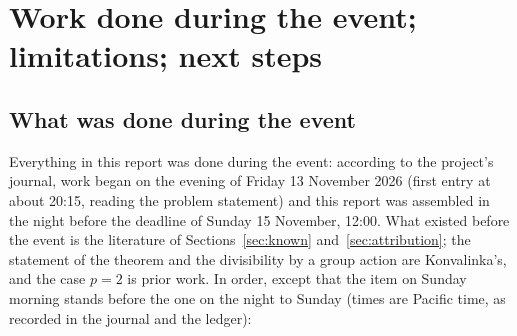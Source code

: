 \documentclass[11pt]{article}
\theoremstyle{definition}
\theoremstyle{remark}
\numberwithin{equation}{section}
\numberwithin{figure}{section}
\begin{document}
\section{Work done during the event; limitations; next steps}\label{sec:event}
\subsection{What was done during the event}
Everything in this report was done during the event: according to the project's journal, work began on the
evening of Friday 13 November 2026 (first entry at about 20:15, reading the problem statement) and this
report was assembled in the night before the deadline of Sunday 15 November, 12:00. What existed before the
event is the literature of Sections~\ref{sec:known} and~\ref{sec:attribution}; the statement of the theorem
and the divisibility by a group action are Konvalinka's, and the case $p=2$ is prior work. In order, except that the item on Sunday morning stands before the one on the night to Sunday (times
are Pacific time, as recorded in the journal and the ledger):
\end{document}
